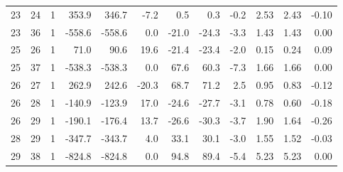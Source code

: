 \documentclass[12pt]{classe_uftex/uftex}
\begin{document}
\begin{landscape}
\begin{longtable}{rrcrrrrrrrrr}
23 & 24 & 1 & 353.9 & 346.7 & -7.2 & 0.5 & 0.3 & -0.2 & 2.53 & 2.43 & -0.10 \\
23 & 36 & 1 & -558.6 & -558.6 & 0.0 & -21.0 & -24.3 & -3.3 & 1.43 & 1.43 & 0.00 \\
25 & 26 & 1 & 71.0 & 90.6 & 19.6 & -21.4 & -23.4 & -2.0 & 0.15 & 0.24 & 0.09 \\
25 & 37 & 1 & -538.3 & -538.3 & 0.0 & 67.6 & 60.3 & -7.3 & 1.66 & 1.66 & 0.00 \\
26 & 27 & 1 & 262.9 & 242.6 & -20.3 & 68.7 & 71.2 & 2.5 & 0.95 & 0.83 & -0.12 \\
26 & 28 & 1 & -140.9 & -123.9 & 17.0 & -24.6 & -27.7 & -3.1 & 0.78 & 0.60 & -0.18 \\
26 & 29 & 1 & -190.1 & -176.4 & 13.7 & -26.6 & -30.3 & -3.7 & 1.90 & 1.64 & -0.26 \\
28 & 29 & 1 & -347.7 & -343.7 & 4.0 & 33.1 & 30.1 & -3.0 & 1.55 & 1.52 & -0.03 \\
29 & 38 & 1 & -824.8 & -824.8 & 0.0 & 94.8 & 89.4 & -5.4 & 5.23 & 5.23 & 0.00 \\
\end{longtable}
\end{landscape}
\normalsize
\end{document}
